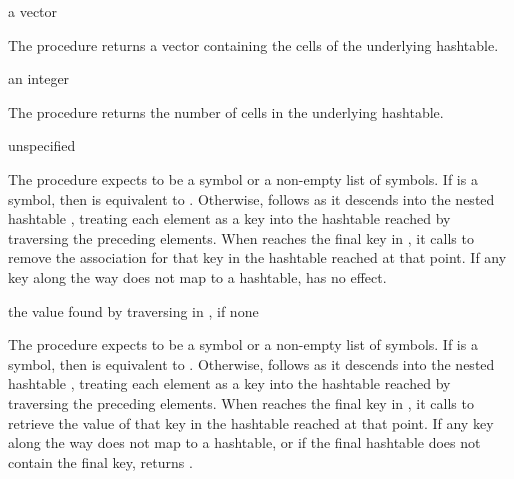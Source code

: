 \begin{procedure}
\end{procedure}
\returns{} a vector

The  procedure returns a vector containing the
cells of the underlying hashtable.

\begin{procedure}
\end{procedure}
\returns{} an integer

The  procedure returns the number of cells
in the underlying hashtable.

\begin{procedure}
\end{procedure}
\returns{} unspecified

The  procedure expects  to be a symbol or
a non-empty list of symbols.
If  is a symbol, then  is equivalent
to .
Otherwise,  follows  as it descends into
the nested hashtable , treating each element as a key into
the hashtable reached by traversing the preceding elements.
When  reaches the final key in ,
it calls  to remove the association for
that key in the hashtable reached at that point.
If any key along the way does not map to a hashtable,
 has no effect.

\begin{procedure}
\end{procedure}
\returns{} the value found by traversing  in ,
 if none

The  procedure expects  to be a symbol or
a non-empty list of symbols.
If  is a symbol, then  is equivalent
to .
Otherwise,  follows  as it descends into
the nested hashtable , treating each element as a key into
the hashtable reached by traversing the preceding elements.
When  reaches the final key in ,
it calls  to retrieve the value of that key
in the hashtable reached at that point.
If any key along the way does not map to a hashtable,
or if the final hashtable does not contain the final key,
 returns .

